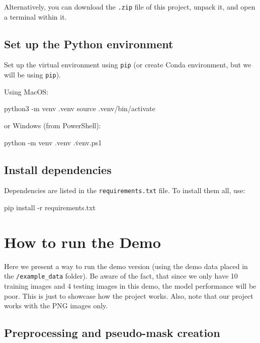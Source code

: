 Alternatively, you can download the \texttt{.zip} file of this project,
unpack it, and open a terminal within it.

\subsection{Set up the Python
environment}\label{set-up-the-python-environment}

Set up the virtual environment using \texttt{pip} (or create Conda
environment, but we will be using \texttt{pip}).

Using MacOS:

\begin{bashlisting}
python3 -m venv .venv
source .venv/bin/activate
\end{bashlisting}

or Windows (from PowerShell):

\begin{pslisting}
python -m venv .venv
.\.venv\Scripts\Activate.ps1 
\end{pslisting}

\subsection{Install dependencies}\label{install-dependencies}

Dependencies are listed in the \texttt{requirements.txt} file. To
install them all, use:

\begin{bashlisting}
pip install -r requirements.txt
\end{bashlisting}

\section{How to run the Demo}
\label{how-to-run-the-demo}

Here we present a way to run the demo version (using the demo data
placed in the \texttt{/example\_data} folder). Be aware of the fact,
that since we only have 10 training images and 4 testing images in this
demo, the model performance will be poor. This is just to showcase how
the project works. Also, note that our project works with the PNG images only.

\subsection{Preprocessing and pseudo-mask
creation}\label{preprocessing-and-pseudo-mask-creation}

